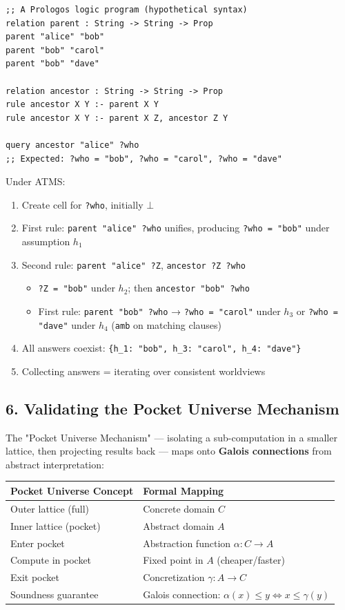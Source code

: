 \documentclass[11pt]{article}
\begin{document}
\begin{verbatim}
;; A Prologos logic program (hypothetical syntax)
relation parent : String -> String -> Prop
parent "alice" "bob"
parent "bob" "carol"
parent "bob" "dave"

relation ancestor : String -> String -> Prop
rule ancestor X Y :- parent X Y
rule ancestor X Y :- parent X Z, ancestor Z Y

query ancestor "alice" ?who
;; Expected: ?who = "bob", ?who = "carol", ?who = "dave"
\end{verbatim}

Under ATMS:
\begin{enumerate}
\item Create cell for \texttt{?who}, initially \(\bot\)
\item First rule: \texttt{parent "alice" ?who} unifies, producing \texttt{?who = "bob"}
under assumption \(h_1\)
\item Second rule: \texttt{parent "alice" ?Z}, \texttt{ancestor ?Z ?who}
\begin{itemize}
\item \texttt{?Z = "bob"} under \(h_2\); then \texttt{ancestor "bob" ?who}
\item First rule: \texttt{parent "bob" ?who} → \texttt{?who = "carol"} under \(h_3\)
or \texttt{?who = "dave"} under \(h_4\) (\texttt{amb} on matching clauses)
\end{itemize}
\item All answers coexist: \texttt{\{h\_1: "bob", h\_3: "carol", h\_4: "dave"\}}
\item Collecting answers = iterating over consistent worldviews
\end{enumerate}
\subsection{6. Validating the Pocket Universe Mechanism}
\label{sec:orgfbb804a}

The "Pocket Universe Mechanism" --- isolating a sub-computation in a
smaller lattice, then projecting results back --- maps onto \textbf{Galois
connections} from abstract interpretation:

\begin{center}
\begin{tabular}{ll}
Pocket Universe Concept & Formal Mapping\\
\hline
Outer lattice (full) & Concrete domain \(C\)\\
Inner lattice (pocket) & Abstract domain \(A\)\\
Enter pocket & Abstraction function \(\alpha : C \to A\)\\
Compute in pocket & Fixed point in \(A\) (cheaper/faster)\\
Exit pocket & Concretization \(\gamma : A \to C\)\\
Soundness guarantee & Galois connection: \(\alpha(x) \leq y \iff x \leq \gamma(y)\)\\
\end{tabular}
\end{center}
\end{document}
